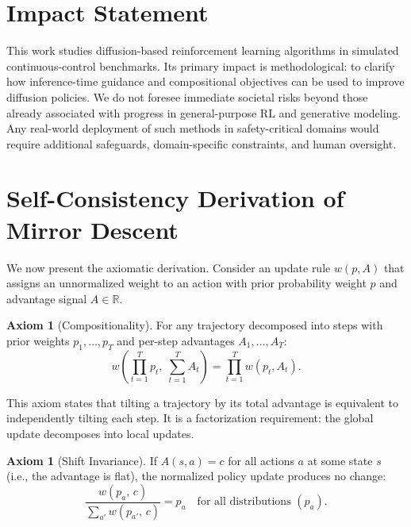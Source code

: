 \documentclass{article}
\theoremstyle{plain}
\theoremstyle{definition}
\newtheorem{axiom}[theorem]{Axiom}
\theoremstyle{remark}
\newcommand{\R}{\mathbb{R}}
\begin{document}
\section*{Impact Statement}

This work studies diffusion-based reinforcement learning algorithms in simulated continuous-control benchmarks.
Its primary impact is methodological: to clarify how inference-time guidance and compositional objectives can be used to improve diffusion policies.
We do not foresee immediate societal risks beyond those already associated with progress in general-purpose RL and generative modeling.
Any real-world deployment of such methods in safety-critical domains would require additional safeguards, domain-specific constraints, and human oversight.




\appendix
\section{Self-Consistency Derivation of Mirror Descent}
\label{sec:self-consistency}

We now present the axiomatic derivation. Consider an update rule $w(p, A)$ that assigns an unnormalized weight to an action with prior probability weight $p$ and advantage signal $A \in \R$.

\begin{axiom}[Compositionality]\label{ax:comp}
For any trajectory decomposed into steps with prior weights $p_1, \ldots, p_T$ and per-step advantages $A_1, \ldots, A_T$:
\[
  w\!\left(\prod_{t=1}^T p_t,\; \sum_{t=1}^T A_t\right) = \prod_{t=1}^T w(p_t, A_t).
\]
\end{axiom}

This axiom states that tilting a trajectory by its total advantage is equivalent to independently tilting each step. It is a factorization requirement: the global update decomposes into local updates.

\begin{axiom}[Shift Invariance]\label{ax:neut}
If $A(s,a) = c$ for all actions $a$ at some state $s$ (i.e., the advantage is flat), the normalized policy update produces no change:
\[
  \frac{w(p_a,\, c)}{\sum_{a'} w(p_{a'},\, c)} = p_a \quad \text{for all distributions } (p_a).
\]
\end{axiom}
\end{document}
